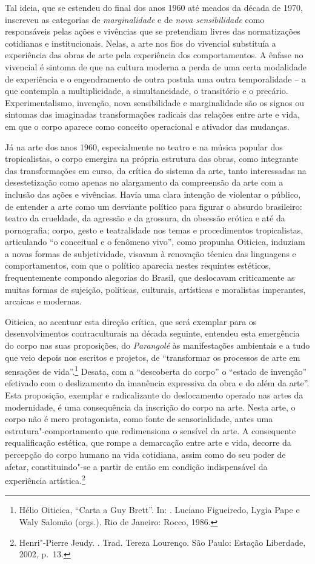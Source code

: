Tal ideia, que se estendeu do final dos anos 1960 até meados da década
de 1970, inscreveu as categorias de \emph{marginalidade} e de \emph{nova
sensibilidade} como responsáveis pelas ações e vivências que se
pretendiam livres das normatizações cotidianas e institucionais. Nelas,
a arte nos fios do vivencial substituía a experiência das obras de arte
pela experiência dos comportamentos. A ênfase no vivencial é sintoma de
que na cultura moderna a perda de uma certa modalidade de experiência e
o engendramento de outra postula uma outra temporalidade -- a que
contempla a multiplicidade, a simultaneidade, o transitório e o
precário. Experimentalismo, invenção, nova sensibilidade e marginalidade
são os signos ou sintomas das imaginadas transformações radicais das
relações entre arte e vida, em que o corpo aparece como conceito
operacional e ativador das mudanças.

Já na arte dos anos 1960, especialmente no teatro e na música popular
dos tropicalistas, o corpo emergira na própria estrutura das obras, como
integrante das transformações em curso, da crítica do sistema da arte,
tanto interessadas na desestetização como apenas no alargamento da
compreensão da arte com a inclusão das ações e vivências. Havia uma clara
intenção de violentar o público, de entender a arte como um desviante
político para figurar o absurdo brasileiro: teatro da crueldade, da
agressão e da grossura, da obsessão erótica e até da pornografia; corpo,
gesto e teatralidade nos temas e procedimentos tropicalistas,
articulando ``o conceitual e o fenômeno vivo'', como propunha Oiticica,
induziam a novas formas de subjetividade, visavam à renovação técnica
das linguagens e comportamentos, com que o político aparecia nestes
requintes estéticos, frequentemente compondo alegorias do Brasil, que
deslocavam criticamente as muitas formas de sujeição, políticas,
culturais, artísticas e moralistas imperantes, arcaicas e modernas.

Oiticica, ao acentuar esta direção crítica, que será exemplar para os
desenvolvimentos contraculturais na década seguinte, entendeu esta
emergência do corpo nas suas proposições, do \emph{Parangolé} às
manifestações ambientais e a tudo que veio depois nos escritos e
projetos, de ``transformar os processos de arte em sensações de
vida''.\footnote{Hélio Oiticica, ``Carta a Guy Brett''. In: {}. Luciano Figueiredo, Lygia Pape e Waly Salomão
  (orgs.). Rio de Janeiro: Rocco, 1986.} Desata, com a ``descoberta do
corpo'' o ``estado de invenção'' efetivado com o deslizamento da
imanência expressiva da obra e do além da arte''. Esta proposição,
exemplar e radicalizante do deslocamento operado nas artes da
modernidade, é uma consequência da inscrição do corpo na arte. Nesta
arte, o corpo não é mero protagonista, como fonte de sensorialidade,
antes uma estrutura"-comportamento que redimensiona o sensível da arte. A
consequente requalificação estética, que rompe a demarcação entre arte e
vida, decorre da percepção do corpo humano na vida cotidiana, assim como
do seu poder de afetar, constituindo"-se a partir de então em condição
indispensável da experiência artística.\footnote{Henri"-Pierre Jeudy.
  {}. Trad. Tereza Lourenço. São Paulo:
  Estação Liberdade, 2002, p.~13.}

